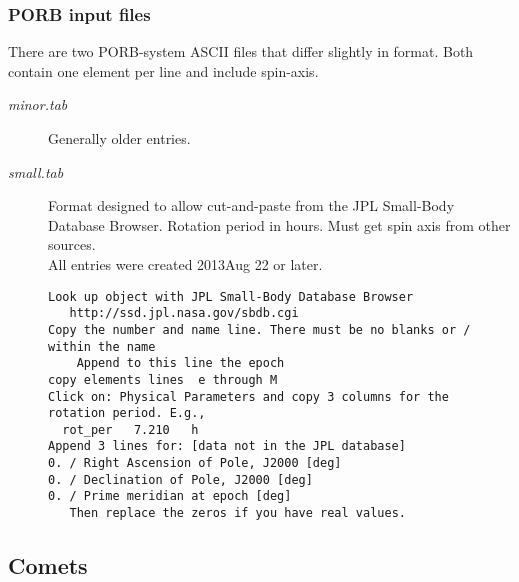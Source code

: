 \documentclass[draft]{article}  %
\begin{document}
\subsubsection{PORB input files} %
There are two PORB-system ASCII files that differ slightly in format. Both
contain one element per line and include spin-axis.

\begin{description} 
 \item [\textit{minor.tab}] Generally older entries.

 \item [\textit{small.tab}]  Format designed to allow cut-and-paste from the JPL Small-Body Database 
Browser. Rotation period in hours. Must get spin axis from other sources.
\\ All entries were created 2013Aug 22 or later.
\begin{verbatim}
Look up object with JPL Small-Body Database Browser  
   http://ssd.jpl.nasa.gov/sbdb.cgi
Copy the number and name line. There must be no blanks or / within the name
    Append to this line the epoch
copy elements lines  e through M
Click on: Physical Parameters and copy 3 columns for the rotation period. E.g.,
  rot_per 	7.210 	h
Append 3 lines for: [data not in the JPL database]
0. / Right Ascension of Pole, J2000 [deg]   
0. / Declination of Pole, J2000 [deg]
0. / Prime meridian at epoch [deg]
   Then replace the zeros if you have real values.
\end{verbatim}

\end{description}

\subsection{Comets}
\end{document}
